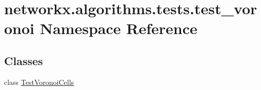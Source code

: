 \hypertarget{namespacenetworkx_1_1algorithms_1_1tests_1_1test__voronoi}{}\section{networkx.\+algorithms.\+tests.\+test\+\_\+voronoi Namespace Reference}
\label{namespacenetworkx_1_1algorithms_1_1tests_1_1test__voronoi}
\subsection*{Classes}
\begin{DoxyCompactItemize}
\item 
class \hyperlink{classnetworkx_1_1algorithms_1_1tests_1_1test__voronoi_1_1TestVoronoiCells}{Test\+Voronoi\+Cells}
\end{DoxyCompactItemize}
